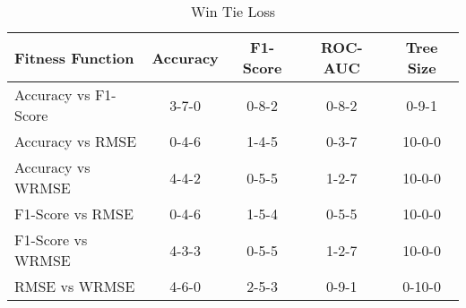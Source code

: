 
    \begin{table}[H]
        \centering
        \renewcommand{\arraystretch}{1.2}
        \caption{Win Tie Loss}
        \label{tab:RQ_Fitness_wtl}
    \begin{tabular}{lcccc}
\toprule
Fitness Function & Accuracy & F1-Score & ROC-AUC & Tree Size \\
\midrule
Accuracy vs F1-Score & 3-7-0 & 0-8-2 & 0-8-2 & 0-9-1 \\
Accuracy vs RMSE & 0-4-6 & 1-4-5 & 0-3-7 & 10-0-0 \\
Accuracy vs WRMSE & 4-4-2 & 0-5-5 & 1-2-7 & 10-0-0 \\
F1-Score vs RMSE & 0-4-6 & 1-5-4 & 0-5-5 & 10-0-0 \\
F1-Score vs WRMSE & 4-3-3 & 0-5-5 & 1-2-7 & 10-0-0 \\
RMSE vs WRMSE & 4-6-0 & 2-5-3 & 0-9-1 & 0-10-0 \\
\bottomrule
\end{tabular}

        
    \end{table}
    